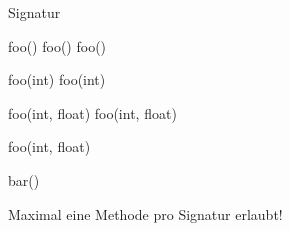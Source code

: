 \begin{frame}{Signatur}\onslide<+->
    \begin{solve}
    \begin{minipage}[t]{0.25\linewidth}
    \begin{plainjava}
foo()
foo()
foo()
    \end{plainjava}
    \end{minipage}\nolinebreak%
    \begin{minipage}[t]{0.25\linewidth}
    \begin{plainjava}
foo(int)
foo(int)
    \end{plainjava}
    \end{minipage}\nolinebreak%
    \begin{minipage}[t]{0.25\linewidth}
    \begin{plainjava}
foo(int, float)
foo(int, float)
    \end{plainjava}
    \bigskip
    \begin{plainjava}
foo(int, float)
    \end{plainjava}
    \end{minipage}\nolinebreak%
    \begin{minipage}[t]{0.25\linewidth}
    \begin{plainjava}
bar()
    \end{plainjava}
    \end{minipage}

    \onslide<+-> Maximal eine Methode pro Signatur erlaubt!
    \end{solve}
\end{frame}